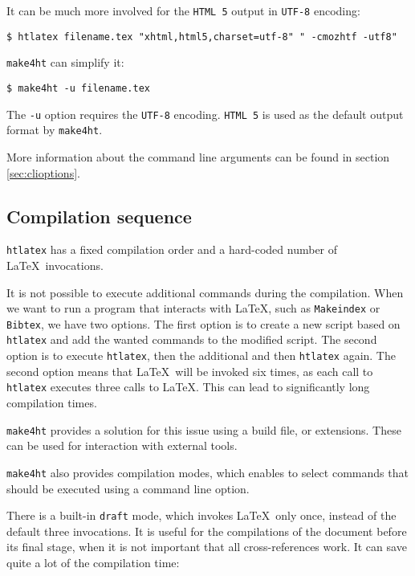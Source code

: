 It can be much more involved for the \texttt{HTML\ 5} output in
\texttt{UTF-8} encoding:

\begin{verbatim}
$ htlatex filename.tex "xhtml,html5,charset=utf-8" " -cmozhtf -utf8"
\end{verbatim}

\texttt{make4ht} can simplify it:

\begin{verbatim}
$ make4ht -u filename.tex
\end{verbatim}

The \texttt{-u} option requires the \texttt{UTF-8} encoding.
\texttt{HTML\ 5} is used as the default output format by
\texttt{make4ht}.

More information about the command line arguments can be found in
section \ref{sec:clioptions}.

\hypertarget{compilation-sequence}{%
\subsection{Compilation sequence}\label{compilation-sequence}}

\texttt{htlatex} has a fixed compilation order and a hard-coded number
of \LaTeX~invocations.

It is not possible to execute additional commands during the
compilation. When we want to run a program that interacts with \LaTeX,
such as \texttt{Makeindex} or \texttt{Bibtex}, we have two options. The
first option is to create a new script based on \texttt{htlatex} and add
the wanted commands to the modified script. The second option is to
execute \texttt{htlatex}, then the additional and then \texttt{htlatex}
again. The second option means that \LaTeX~will be invoked six times, as
each call to \texttt{htlatex} executes three calls to \LaTeX. This can
lead to significantly long compilation times.

\texttt{make4ht} provides a solution for this issue using a build file,
or extensions. These can be used for interaction with external tools.

\texttt{make4ht} also provides compilation modes, which enables to
select commands that should be executed using a command line option.

There is a built-in \texttt{draft} mode, which invokes \LaTeX~only once,
instead of the default three invocations. It is useful for the
compilations of the document before its final stage, when it is not
important that all cross-references work. It can save quite a lot of the
compilation time:


